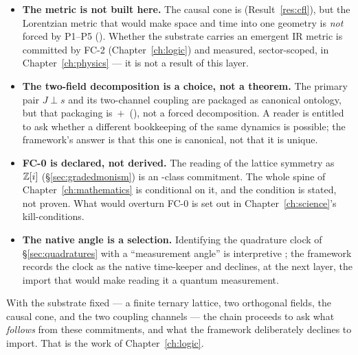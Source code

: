 \begin{itemize}[leftmargin=1.4em,itemsep=3pt]
  \item \textbf{The metric is not built here.} The causal cone is 
    (Result~\ref{res:cfl}), but the Lorentzian metric that would make space and
    time into one geometry is \emph{not} forced by P1--P5 (). Whether
    the substrate carries an emergent IR metric is committed by FC-2
    (Chapter~\ref{ch:logic}) and measured, sector-scoped, in
    Chapter~\ref{ch:physics} --- it is not a result of this layer.
  \item \textbf{The two-field decomposition is a choice, not a theorem.} The
    primary pair $J\perp s$ and its two-channel coupling are packaged as canonical
    ontology, but that packaging is \,$+$\, (), not
    a forced decomposition. A reader is entitled to ask whether a different
    bookkeeping of the same dynamics is possible; the framework's answer is that
    this one is canonical, not that it is unique.
  \item \textbf{FC-0 is declared, not derived.} The reading of the lattice
    symmetry as $\mathbb{Z}[i]$ (\S\ref{sec:gradedmonism}) is an -class commitment.
    The whole spine of Chapter~\ref{ch:mathematics} is conditional on it, and the
    condition is stated, not proven. What would overturn FC-0 is set out in
    Chapter~\ref{ch:science}'s kill-conditions.
  \item \textbf{The native angle is a selection.} Identifying the quadrature clock
    of \S\ref{sec:quadratures} with a ``measurement angle'' is interpretive
    ; the framework records the clock as the native time-keeper and
    declines, at the next layer, the import that would make reading it a quantum
    measurement.
\end{itemize}

\noindent With the substrate fixed --- a finite ternary lattice, two orthogonal
fields, the causal cone, and the two coupling channels --- the chain proceeds to
ask what \emph{follows} from these commitments, and what the framework deliberately
declines to import. That is the work of Chapter~\ref{ch:logic}.
